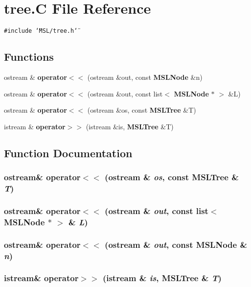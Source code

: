\section{tree.C File Reference}
\label{tree_8C}
{\tt \#include \char`\"{}MSL/tree.h\char`\"{}}\par
\subsection*{Functions}
\begin{CompactItemize}
\item 
ostream \& {\bf operator$<$$<$} (ostream \&out, const {\bf MSLNode} \&n)
\item 
ostream \& {\bf operator$<$$<$} (ostream \&out, const list$<$ {\bf MSLNode} $\ast$ $>$ \&L)
\item 
ostream \& {\bf operator$<$$<$} (ostream \&os, const {\bf MSLTree} \&T)
\item 
istream \& {\bf operator$>$$>$} (istream \&is, {\bf MSLTree} \&T)
\end{CompactItemize}


\subsection{Function Documentation}
\subsubsection{\setlength{\rightskip}{0pt plus 5cm}ostream\& operator$<$$<$ (ostream \& {\em os}, const {\bf MSLTree} \& {\em T})}\label{tree_8C_a2}


\subsubsection{\setlength{\rightskip}{0pt plus 5cm}ostream\& operator$<$$<$ (ostream \& {\em out}, const list$<$ {\bf MSLNode} $\ast$ $>$ \& {\em L})}\label{tree_8C_a1}


\subsubsection{\setlength{\rightskip}{0pt plus 5cm}ostream\& operator$<$$<$ (ostream \& {\em out}, const {\bf MSLNode} \& {\em n})}\label{tree_8C_a0}


\subsubsection{\setlength{\rightskip}{0pt plus 5cm}istream\& operator$>$$>$ (istream \& {\em is}, {\bf MSLTree} \& {\em T})}\label{tree_8C_a3}


